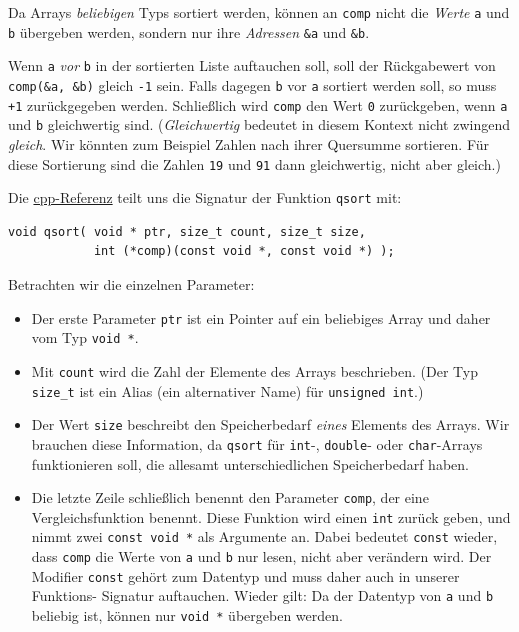 Da Arrays \emph{beliebigen} Typs sortiert werden, können an \texttt{comp} nicht die \emph{Werte} \texttt{a} und \texttt{b} übergeben werden, sondern nur ihre \emph{Adressen} \texttt{\&a} und \texttt{\&b}.

Wenn \texttt{a} \emph{vor} \texttt{b} in der sortierten Liste auftauchen soll, soll der Rückgabewert von \texttt{comp(\&a, \&b)} gleich \texttt{-1} sein. Falls dagegen \texttt{b} vor \texttt{a} sortiert werden soll, so muss \texttt{+1} zurückgegeben werden. Schließlich wird \texttt{comp} den Wert \texttt{0} zurückgeben, wenn \texttt{a} und \texttt{b} gleichwertig sind. (\emph{Gleichwertig} bedeutet in diesem Kontext nicht zwingend \emph{gleich}. Wir könnten zum Beispiel Zahlen nach ihrer Quersumme sortieren. Für diese Sortierung sind die Zahlen \texttt{19} und \texttt{91} dann gleichwertig, nicht aber gleich.)

Die \href{https://en.cppreference.com/w/c/algorithm/qsort}{cpp-Referenz} teilt uns die Signatur der Funktion \texttt{qsort} mit:

\begin{codebox}
\begin{verbatim}
void qsort( void * ptr, size_t count, size_t size,
            int (*comp)(const void *, const void *) );
\end{verbatim}
\end{codebox}

Betrachten wir die einzelnen Parameter:
\begin{itemize}
\item Der erste Parameter \texttt{ptr} ist ein Pointer auf ein beliebiges Array und daher vom Typ
		\texttt{void *}.
\item Mit \texttt{count} wird die Zahl der Elemente des Arrays beschrieben. (Der Typ
		\texttt{size_t} ist ein Alias (ein alternativer Name) für \texttt{unsigned int}.)
\item Der Wert \texttt{size} beschreibt den Speicherbedarf \emph{eines} Elements des Arrays. Wir
		brauchen diese Information, da \texttt{qsort} \ua für \texttt{int}-,
		\texttt{double}- oder \texttt{char}-Arrays funktionieren soll, die allesamt
		unterschiedlichen Speicherbedarf haben.
\item Die letzte Zeile schließlich benennt den Parameter \texttt{comp}, der eine Vergleichsfunktion
		benennt. Diese Funktion wird einen \texttt{int} zurück geben, und nimmt zwei
		\texttt{const void *} als Argumente an. Dabei bedeutet \texttt{const} wieder, dass
		\texttt{comp} die Werte von \texttt{a} und \texttt{b} nur lesen, nicht aber verändern wird.
		Der Modifier \texttt{const} gehört zum Datentyp und muss daher auch in unserer Funktions-
		Signatur auftauchen. Wieder gilt: Da der Datentyp von \texttt{a} und \texttt{b} beliebig ist,
		können nur \texttt{void *} übergeben werden.
\end{itemize}

